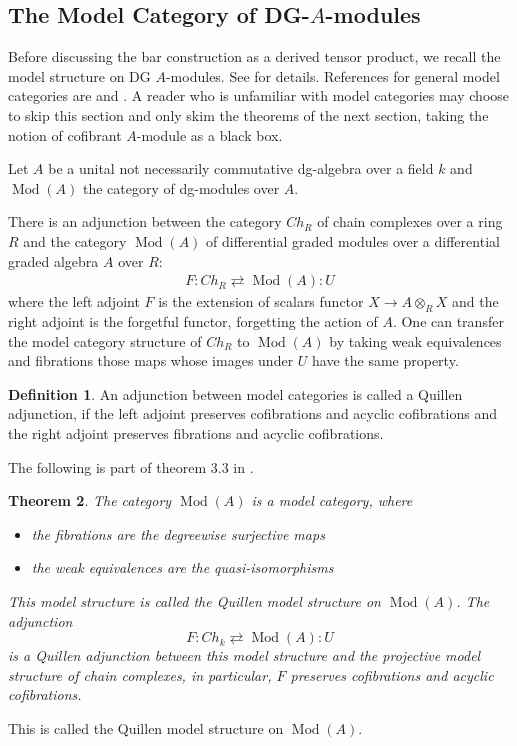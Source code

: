\documentclass{scrartcl}
\theoremstyle{plain}
\newtheorem{theorem}{Theorem}[section]
\theoremstyle{definition}
\newtheorem{definition}[theorem]{Definition}
\DeclareMathOperator{\Mod}{Mod}
\begin{document}
\subsection{The Model Category of DG-$A$-modules} \label{subsec:model-dg-mod}
Before discussing the bar construction as a derived tensor product, we recall the model structure on DG $A$-modules. See \cite{barthel2013six} for details. References for general model categories are \cite{hovey2007model} and \cite{hirschhorn2003model}. A reader who is unfamiliar with model categories may choose to skip this section and only skim the theorems of the next section, taking the notion of cofibrant $A$-module as a black box. 

Let $A$ be a unital not necessarily commutative dg-algebra over a field $k$ and $\Mod(A)$ the category of dg-modules over $A$. 

There is an adjunction between the category $Ch_R$ of chain complexes over a ring $R$ and the category $\Mod(A)$ of differential graded modules over a differential graded algebra $A$ over $R$:
\begin{align*}
    F\colon Ch_R\rightleftarrows \Mod(A) \colon U
\end{align*}
where the left adjoint $F$ is the extension of scalars functor $X\to A\otimes_R X$ and the right adjoint is the forgetful functor, forgetting the action of $A$. One can transfer the model category structure of $Ch_R$ to $\Mod(A)$ by taking weak equivalences and fibrations those maps whose images under $U$ have the same property.

\begin{definition}
    An adjunction between model categories is called a Quillen adjunction, if the left adjoint preserves cofibrations and acyclic cofibrations and the right adjoint preserves fibrations and acyclic cofibrations. 
\end{definition}

The following is part of theorem 3.3 in \cite{barthel2013six}.
\begin{theorem}
    The category $\Mod(A)$ is a model category, where
    \begin{itemize}
        \item the fibrations are the degreewise surjective maps
        \item the weak equivalences are the quasi-isomorphisms
    \end{itemize}
    This model structure is called the Quillen model structure on $\Mod(A)$. 
    The adjunction 
    $$F\colon Ch_k\rightleftarrows \Mod(A) \colon U$$
    is a Quillen adjunction between this model structure and the projective model structure of chain complexes, in particular, $F$ preserves cofibrations and acyclic cofibrations. 
\end{theorem} 
This is called the Quillen model structure on $\Mod(A)$. 
\end{document}
